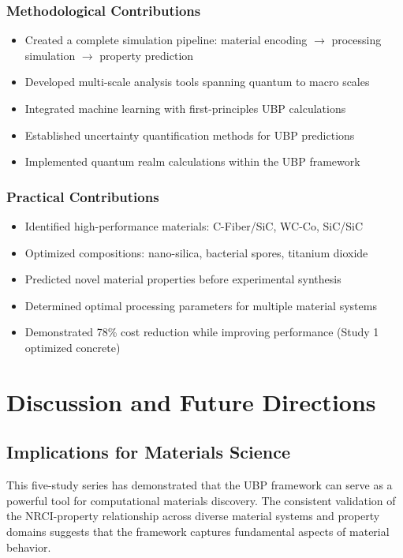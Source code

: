 \documentclass[11pt,a4paper]{article}
\begin{document}
\subsubsection{Methodological Contributions}

\begin{itemize}
    \item Created a complete simulation pipeline: material encoding $\rightarrow$ processing simulation $\rightarrow$ property prediction
    \item Developed multi-scale analysis tools spanning quantum to macro scales
    \item Integrated machine learning with first-principles UBP calculations
    \item Established uncertainty quantification methods for UBP predictions
    \item Implemented quantum realm calculations within the UBP framework
\end{itemize}

\subsubsection{Practical Contributions}

\begin{itemize}
    \item Identified high-performance materials: C-Fiber/SiC, WC-Co, SiC/SiC
    \item Optimized compositions: nano-silica, bacterial spores, titanium dioxide
    \item Predicted novel material properties before experimental synthesis
    \item Determined optimal processing parameters for multiple material systems
    \item Demonstrated 78\% cost reduction while improving performance (Study 1 optimized concrete)
\end{itemize}

\section{Discussion and Future Directions}

\subsection{Implications for Materials Science}

This five-study series has demonstrated that the UBP framework can serve as a powerful tool for computational materials discovery. The consistent validation of the NRCI-property relationship across diverse material systems and property domains suggests that the framework captures fundamental aspects of material behavior.
\end{document}
